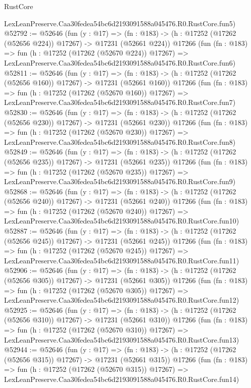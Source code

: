 \begin{lexlean}{RustCore}
\begin{coremodule}
    LexLeanPreserve.Caa30fedea54bc6d2193091588a045476.R0.RustCore.fun5)
@52792 := @52646
    (fun (y : @17) =>
    (fn : @183) -> (h : @17252 (@17262 (@52656 @224)) @17267) -> @17231 (@52661 @224))
    @17266
    (fun (fn : @183) =>
    fun (h : @17252 (@17262 (@52670 @224)) @17267) =>
    LexLeanPreserve.Caa30fedea54bc6d2193091588a045476.R0.RustCore.fun6)
@52811 := @52646
    (fun (y : @17) =>
    (fn : @183) -> (h : @17252 (@17262 (@52656 @160)) @17267) -> @17231 (@52661 @160))
    @17266
    (fun (fn : @183) =>
    fun (h : @17252 (@17262 (@52670 @160)) @17267) =>
    LexLeanPreserve.Caa30fedea54bc6d2193091588a045476.R0.RustCore.fun7)
@52830 := @52646
    (fun (y : @17) =>
    (fn : @183) -> (h : @17252 (@17262 (@52656 @230)) @17267) -> @17231 (@52661 @230))
    @17266
    (fun (fn : @183) =>
    fun (h : @17252 (@17262 (@52670 @230)) @17267) =>
    LexLeanPreserve.Caa30fedea54bc6d2193091588a045476.R0.RustCore.fun8)
@52849 := @52646
    (fun (y : @17) =>
    (fn : @183) -> (h : @17252 (@17262 (@52656 @235)) @17267) -> @17231 (@52661 @235))
    @17266
    (fun (fn : @183) =>
    fun (h : @17252 (@17262 (@52670 @235)) @17267) =>
    LexLeanPreserve.Caa30fedea54bc6d2193091588a045476.R0.RustCore.fun9)
@52868 := @52646
    (fun (y : @17) =>
    (fn : @183) -> (h : @17252 (@17262 (@52656 @240)) @17267) -> @17231 (@52661 @240))
    @17266
    (fun (fn : @183) =>
    fun (h : @17252 (@17262 (@52670 @240)) @17267) =>
    LexLeanPreserve.Caa30fedea54bc6d2193091588a045476.R0.RustCore.fun10)
@52887 := @52646
    (fun (y : @17) =>
    (fn : @183) -> (h : @17252 (@17262 (@52656 @245)) @17267) -> @17231 (@52661 @245))
    @17266
    (fun (fn : @183) =>
    fun (h : @17252 (@17262 (@52670 @245)) @17267) =>
    LexLeanPreserve.Caa30fedea54bc6d2193091588a045476.R0.RustCore.fun11)
@52906 := @52646
    (fun (y : @17) =>
    (fn : @183) -> (h : @17252 (@17262 (@52656 @305)) @17267) -> @17231 (@52661 @305))
    @17266
    (fun (fn : @183) =>
    fun (h : @17252 (@17262 (@52670 @305)) @17267) =>
    LexLeanPreserve.Caa30fedea54bc6d2193091588a045476.R0.RustCore.fun12)
@52925 := @52646
    (fun (y : @17) =>
    (fn : @183) -> (h : @17252 (@17262 (@52656 @310)) @17267) -> @17231 (@52661 @310))
    @17266
    (fun (fn : @183) =>
    fun (h : @17252 (@17262 (@52670 @310)) @17267) =>
    LexLeanPreserve.Caa30fedea54bc6d2193091588a045476.R0.RustCore.fun13)
@52944 := @52646
    (fun (y : @17) =>
    (fn : @183) -> (h : @17252 (@17262 (@52656 @315)) @17267) -> @17231 (@52661 @315))
    @17266
    (fun (fn : @183) =>
    fun (h : @17252 (@17262 (@52670 @315)) @17267) =>
    LexLeanPreserve.Caa30fedea54bc6d2193091588a045476.R0.RustCore.fun14)

\end{coremodule}
\end{lexlean}
